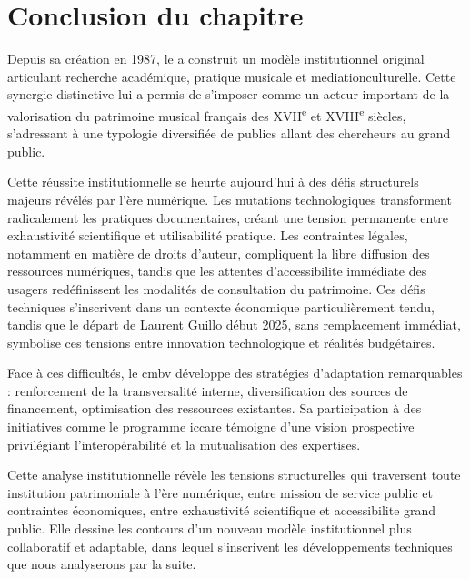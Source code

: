 \section*{Conclusion du chapitre}

Depuis sa création en 1987, le  a construit un modèle institutionnel original articulant recherche académique, pratique musicale et \gls{mediationculturelle}. Cette synergie distinctive lui a permis de s'imposer comme un acteur important de la valorisation du patrimoine musical français des XVII\textsuperscript{e} et XVIII\textsuperscript{e} siècles, s'adressant à une typologie diversifiée de publics allant des chercheurs au grand public.

Cette réussite institutionnelle se heurte aujourd'hui à des défis structurels majeurs révélés par l'ère numérique. Les mutations technologiques transforment radicalement les pratiques documentaires, créant une tension permanente entre exhaustivité scientifique et utilisabilité pratique. Les contraintes légales, notamment en matière de droits d'auteur, compliquent la libre diffusion des ressources numériques, tandis que les attentes d'\gls{accessibilite} immédiate des usagers redéfinissent les modalités de consultation du patrimoine. Ces défis techniques s'inscrivent dans un contexte économique particulièrement tendu, tandis que le départ de Laurent Guillo début 2025, sans remplacement immédiat, symbolise ces tensions entre innovation technologique et réalités budgétaires.

Face à ces difficultés, le \gls{cmbv} développe des stratégies d'adaptation remarquables : renforcement de la transversalité interne, diversification des sources de financement, optimisation des ressources existantes. Sa participation à des initiatives comme le programme \gls{iccare} témoigne d'une vision prospective privilégiant l'interopérabilité et la mutualisation des expertises.

Cette analyse institutionnelle révèle les tensions structurelles qui traversent toute institution patrimoniale à l'ère numérique, entre mission de service public et contraintes économiques, entre exhaustivité scientifique et \gls{accessibilite} grand public. Elle dessine les contours d'un nouveau modèle institutionnel plus collaboratif et adaptable, dans lequel s'inscrivent les développements techniques que nous analyserons par la suite.